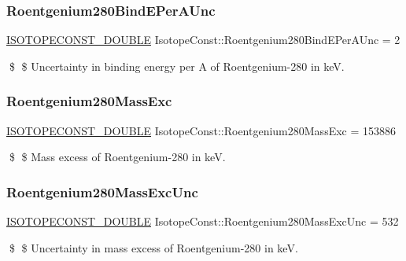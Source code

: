 \subsubsection{\texorpdfstring{Roentgenium280\+Bind\+E\+Per\+A\+Unc}{Roentgenium280BindEPerAUnc}}
{\footnotesize\ttfamily \mbox{\hyperlink{group___isotope_const-_macros_ga8f45a7272ce02c0b4c65c44636ed719a}{I\+S\+O\+T\+O\+P\+E\+C\+O\+N\+S\+T\+\_\+\+D\+O\+U\+B\+LE}} Isotope\+Const\+::\+Roentgenium280\+Bind\+E\+Per\+A\+Unc = 2}

\$ \$ Uncertainty in binding energy per A of Roentgenium-\/280 in keV. \mbox{\label{group___isotope_const-_roentgenium-_rg280_ga8e92ebeecc84bdd71d4e322b2d32d19a}} 
\subsubsection{\texorpdfstring{Roentgenium280\+Mass\+Exc}{Roentgenium280MassExc}}
{\footnotesize\ttfamily \mbox{\hyperlink{group___isotope_const-_macros_ga8f45a7272ce02c0b4c65c44636ed719a}{I\+S\+O\+T\+O\+P\+E\+C\+O\+N\+S\+T\+\_\+\+D\+O\+U\+B\+LE}} Isotope\+Const\+::\+Roentgenium280\+Mass\+Exc = 153886}

\$ \$ Mass excess of Roentgenium-\/280 in keV. \mbox{\label{group___isotope_const-_roentgenium-_rg280_ga9c58b174967dc35ff6f5052ec7fcbcfe}} 
\subsubsection{\texorpdfstring{Roentgenium280\+Mass\+Exc\+Unc}{Roentgenium280MassExcUnc}}
{\footnotesize\ttfamily \mbox{\hyperlink{group___isotope_const-_macros_ga8f45a7272ce02c0b4c65c44636ed719a}{I\+S\+O\+T\+O\+P\+E\+C\+O\+N\+S\+T\+\_\+\+D\+O\+U\+B\+LE}} Isotope\+Const\+::\+Roentgenium280\+Mass\+Exc\+Unc = 532}

\$ \$ Uncertainty in mass excess of Roentgenium-\/280 in keV. \mbox{\label{group___isotope_const-_roentgenium-_rg280_gac5ae1ed86665a81f07dfddb3cd9f3df5}} 
